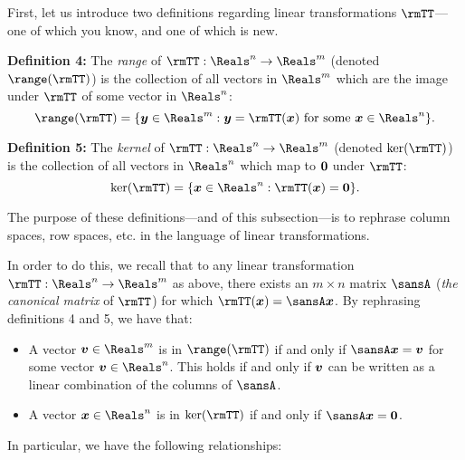 \documentclass[12 pt]{article}
\begin{document}
First, let us introduce two definitions regarding linear transformations $\rmTT$---one of which you know, and one of which is new.

\vspace{3mm}

\begin{adjustwidth}{6mm}{6mm}
	\noindent\textbf{Definition 4:} The \textit{range} of $\rmTT:\Reals^n\to\Reals^m$ (denoted $\range(\rmTT)$) is the collection of all vectors in $\Reals^m$ which are the image under $\rmTT$ of some vector in $\Reals^n$:
	\[
		\range(\rmTT)=\{\vect{y}\in\Reals^m:\vect{y}=\rmTT(\vect{x})\text{ for some }\vect{x}\in\Reals^n\}.
	\]
	
	\vspace{3mm}
	
	\noindent\textbf{Definition 5:} The \textit{kernel} of $\rmTT:\Reals^n\to\Reals^m$ (denoted $\ker(\rmTT)$) is the collection of all vectors in $\Reals^n$ which map to $\boldsymbol{0}$ under $\rmTT$:
	\[
		\ker(\rmTT)=\{\vect{x}\in\Reals^n:\rmTT(\vect{x})=\vect{0}\}.
	\]
\end{adjustwidth}

\vspace{3mm}

The purpose of these definitions---and of this subsection---is to rephrase column spaces, row spaces, etc. in the language of linear transformations. 

In order to do this, we recall that to any linear transformation $\rmTT:\Reals^n\to\Reals^m$ as above, there exists an $m\times n$ matrix $\sansA$ (\textit{the canonical matrix} of $\rmTT$) for which $\rmTT(\vect{x})=\sansA\vect{x}$. By rephrasing definitions 4 and 5, we have that:
\begin{itemize}
	\item A vector $\vect{v}\in\Reals^m$ is in $\range(\rmTT)$ if and only if $\sansA\vect{x}=\vect{v}$ for some vector $\vect{v}\in\Reals^n$. This holds if and only if $\boldsymbol{v}$ can be written as a linear combination of the columns of $\sansA$.
	\item A vector $\vect{x}\in\Reals^n$ is in $\ker(\rmTT)$ if and only if $\sansA\vect{x}=\vect{0}$.
\end{itemize}
In particular, we have the following relationships:

\vspace{3mm}

\end{document}
